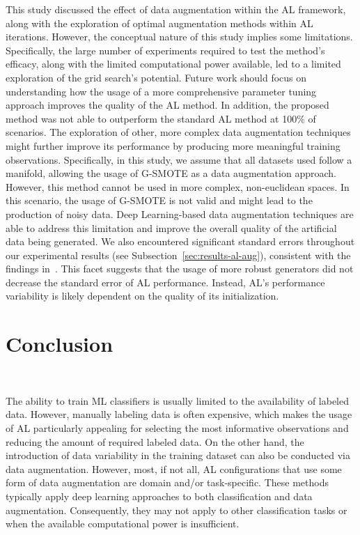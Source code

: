 This study discussed the effect of data augmentation within the AL framework,
along with the exploration of optimal augmentation methods within AL
iterations. However, the conceptual nature of this study implies some
limitations. Specifically, the large number of experiments required to
test the method's efficacy, along with the limited computational power
available, led to a limited exploration of the grid search's potential. Future
work should focus on understanding how the usage of a more comprehensive
parameter tuning approach improves the quality of the AL method. In addition,
the proposed method was not able to outperform the standard AL method at
100\% of scenarios. The exploration of other, more complex data augmentation
techniques might further improve its performance by producing more
meaningful training observations. Specifically, in this study, we assume
that all datasets used follow a manifold, allowing the usage of G-SMOTE as a
data augmentation approach. However, this method cannot be used in more
complex, non-euclidean spaces. In this scenario, the usage of G-SMOTE is not
valid and might lead to the production of noisy data. Deep Learning-based data
augmentation techniques are able to address this limitation and improve the
overall quality of the artificial data being generated. We also
encountered significant standard errors throughout our experimental
results (see Subsection~\ref{sec:results-al-aug}), consistent with the findings
in~\cite{Fonseca2021al, Kottke2017}. This facet suggests that the usage of
more robust generators did not decrease the standard error of AL performance.
Instead, AL's performance variability is likely dependent on the quality of
its initialization.

\section{Conclusion}~\label{sec:conclusion-al-aug}

The ability to train ML classifiers is usually limited to the
availability of labeled data. However, manually labeling data is often
expensive, which makes the usage of AL particularly appealing for
selecting the most informative observations and reducing the amount
of required labeled data. On the other hand, the introduction of data
variability in the training dataset can also be conducted via data augmentation.
However, most, if not all, AL configurations that use some form of
data augmentation are domain and/or task-specific. These methods
typically apply deep learning approaches to both classification and
data augmentation. Consequently, they may not apply to other
classification tasks or when the available computational power is
insufficient.

